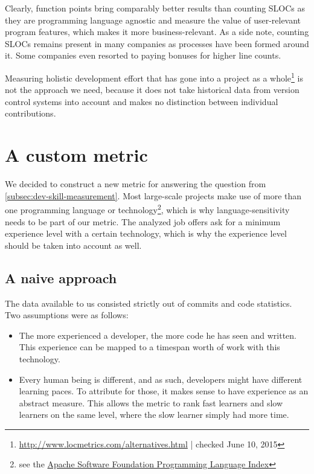 Clearly, function points bring comparably better results than counting SLOCs as they are programming language agnostic and measure the value of user-relevant program features, which makes it more business-relevant. As a side note, counting SLOCs remains present in many companies as processes have been formed around it. Some companies even resorted to paying bonuses for higher line counts\cite{am:2009}.
\newline

Measuring holistic development effort that has gone into a project as a whole\footnote{\url{http://www.locmetrics.com/alternatives.html} | checked June 10, 2015} is not the approach we need, because it does not take historical data from version control systems into account and makes no distinction between individual contributions.

\section{A custom metric}
We decided to construct a new metric for answering the question from \ref{subsec:dev-skill-measurement}. Most large-scale projects make use of more than one programming language or technology\footnote{see \eg the \href{http://projects.apache.org/indexes/language.html}{Apache Software Foundation Programming Language Index}}, which is why language-sensitivity needs to be part of our metric. The analyzed job offers ask for a minimum experience level with a certain technology, which is why the experience level should be taken into account  as well.

\subsection{A naive approach}
The data available to us consisted strictly out of commits and code statistics. Two assumptions were as follows:

\begin{itemize}
 \item The more experienced a developer, the more code he has seen and written. This experience can be mapped to a timespan worth of work with this technology.
 \item Every human being is different, and as such, developers might have different learning paces. To attribute for those, it makes sense to have experience as an abstract measure. This allows the metric to rank fast learners and slow learners on the same level, where the slow learner simply had more time.
\end{itemize}

